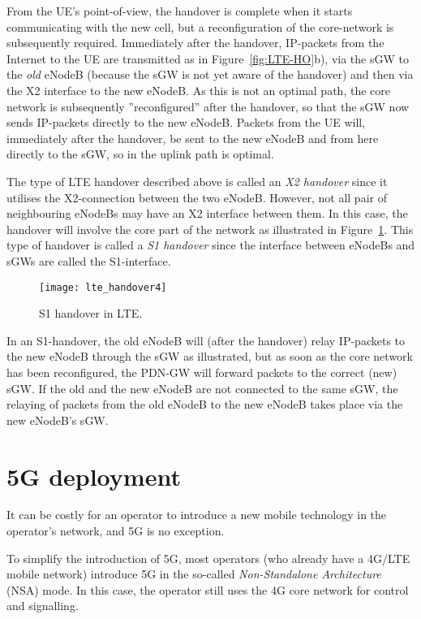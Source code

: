 From the UE's point-of-view, the handover is complete when it starts communicating with the new cell, but a reconfiguration of the core-network is subsequently required. Immediately after the handover, IP-packets from the Internet to the UE are transmitted as in Figure~\ref{fig:LTE-HO}b), \ie via the sGW to the \emph{old} eNodeB (because the sGW is not yet aware of the handover) and then via the X2 interface to the new eNodeB. As this is not an optimal path, the core network is subsequently ''reconfigured'' after the handover, so that the sGW now sends IP-packets directly to the new eNodeB. Packets from the UE will, immediately after the handover, be sent to the new eNodeB and from here directly to the sGW, so in the uplink path is optimal.

The type of LTE handover described above is called an \emph{X2 handover} since it utilises the X2-connection between the two eNodeB. However, not all pair of neighbouring eNodeBs may have an X2 interface between them. In this case, the handover will involve the core part of the network as illustrated in Figure~\ref{fig:LTE_Handover4}. This type of handover is called a \emph{S1 handover} since the interface between eNodeBs and sGWs are called the S1-interface.

\begin{figure}[htbp]
\centering
\texttt{[image: lte\_handover4]}
\caption{\label{fig:LTE_Handover4}S1 handover in LTE.}
\end{figure}

In an S1-handover, the old eNodeB will (after the handover) relay IP-packets to the new eNodeB through the sGW as illustrated, but as soon as the core network has been reconfigured, the PDN-GW will forward packets to the correct (new) sGW. If the old and the new eNodeB are not connected to the same sGW, the relaying of packets from the old eNodeB to the new eNodeB takes place via the new eNodeB's sGW.

\section{5G deployment}
It can be costly for an operator to introduce a new mobile technology in the operator's network, and 5G is no exception.

To simplify the introduction of 5G, most operators (who already have a 4G/LTE mobile network) introduce 5G in the so-called \emph{Non-Standalone Architecture} (NSA) mode. In this case, the operator still uses the 4G core network for control and signalling.

